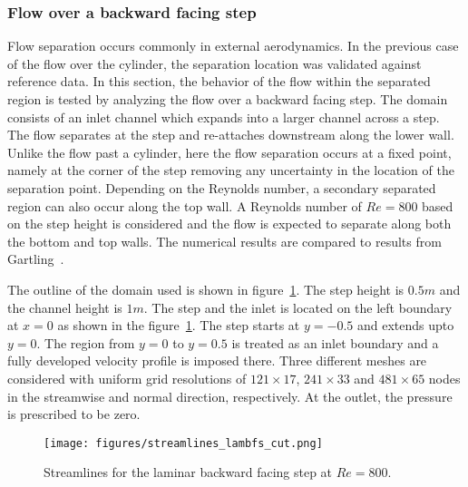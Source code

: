 \subsubsection{Flow over a backward facing step}
Flow separation occurs commonly in external aerodynamics. In the previous case of the flow over the cylinder, the separation location was validated against reference data. In this section, the behavior of the flow within the separated region is tested by analyzing the flow over a backward facing step. The domain consists of an inlet channel which expands into a larger channel across a step. The flow separates at the step and re-attaches downstream along the lower wall. Unlike the flow past a cylinder, here the flow separation occurs at a fixed point, namely at the corner of the step removing any uncertainty in the location of the separation point. Depending on the Reynolds number, a secondary separated region can also occur along the top wall. A Reynolds number of $Re=800$ based on the step height is considered and the flow is expected to separate along both the bottom and top walls. The numerical results are compared to results from Gartling~\cite{gartling4}. 

The outline of the domain used is shown in figure~\ref{fig:lambfsstr}. The step height is $0.5m$ and the channel height is $1m$. The step and the inlet is located on the left boundary at $x=0$ as shown in the figure~\ref{fig:lambfsstr}. The step starts at $y=-0.5$ and extends upto $y=0$. The region from $y=0$ to $y=0.5$ is treated as an inlet boundary and a fully developed velocity profile is imposed there. Three different meshes are considered with uniform grid resolutions of $121\times17$, $241\times33$ and $481\times65$ nodes in the streamwise and normal direction, respectively. At the outlet, the pressure is prescribed to be zero.
\begin{figure}[h!]
    \centering
    \captionsetup{justification=centering}
    \texttt{[image: figures/streamlines\_lambfs\_cut.png]}
    \caption{Streamlines for the laminar backward facing step at $Re=800$.}
     \label{fig:lambfsstr}
\end{figure}
 

